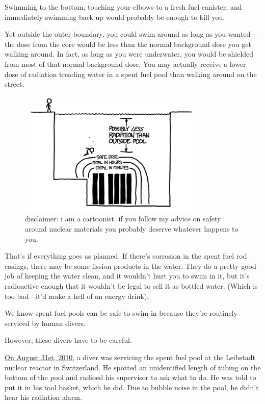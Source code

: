 {Swimming to the bottom, touching your elbows to a fresh fuel canister, and immediately swimming back up would probably be enough to kill you.}

{Yet outside the outer boundary, you could swim around as long as you wanted—the dose from the core would be less than the normal background dose you get walking around. In fact, as long as you were underwater, you would be shielded from most of that normal background dose. You may actually receive a lower dose of radiation treading water in a spent fuel pool than walking around on the street.}

\begin{figure}[!htbp]
\centering
\includegraphics[scale=0.5, max width=0.8\textwidth]{imgs/a/29/pool_safe.png}
\caption{disclaimer: i am a cartoonist. if you follow my advice on safety around nuclear materials you probably deserve whatever happens to you.}
\end{figure}

{That’s if everything goes as planned. If there’s corrosion in the spent fuel rod casings, there may be some fission products in the water. They do a pretty good job of keeping the water clean, and it wouldn’t hurt you to swim in it, but it’s radioactive enough that it wouldn’t be legal to sell it as bottled water. (Which is too bad—it’d make a hell of an energy drink).}

{We know spent fuel pools can be safe to swim in because they’re routinely serviced by human divers.}

{However, these divers have to be careful.}

{ \href{http://www.isoe-network.net/index.php/publications-mainmenu-88/isoe-news/doc\_download/1756-ritter2011ppt.html}{On August 31st, 2010}, a diver was servicing the spent fuel pool at the Leibstadt nuclear reactor in Switzerland. He spotted an unidentified length of tubing on the bottom of the pool and radioed his supervisor to ask what to do. He was told to put it in his tool basket, which he did. Due to bubble noise in the pool, he didn’t hear his radiation alarm.}

